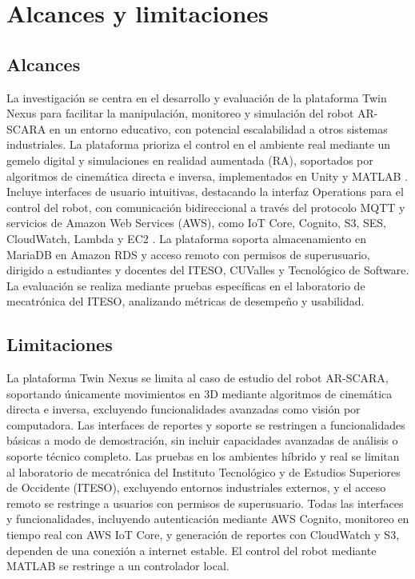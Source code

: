 \documentclass[12pt,letterpaper]{report}
\begin{document}
	\section{Alcances y limitaciones}
	\subsection{Alcances}
	La investigación se centra en el desarrollo y evaluación de la plataforma Twin Nexus para facilitar la manipulación, monitoreo y simulación del robot AR-SCARA en un entorno educativo, con potencial escalabilidad a otros sistemas industriales. La plataforma prioriza el control en el ambiente real mediante un gemelo digital y simulaciones en realidad aumentada (RA), soportados por algoritmos de cinemática directa e inversa, implementados en Unity y MATLAB \cite{mathworks_kinematics_scara_2023}. Incluye interfaces de usuario intuitivas, destacando la interfaz Operations para el control del robot, con comunicación bidireccional a través del protocolo MQTT y servicios de Amazon Web Services (AWS), como IoT Core, Cognito, S3, SES, CloudWatch, Lambda y EC2 \cite{aws_connected_factory_2020}. La plataforma soporta almacenamiento en MariaDB en Amazon RDS y acceso remoto con permisos de superusuario, dirigido a estudiantes y docentes del ITESO, CUValles y Tecnológico de Software. La evaluación se realiza mediante pruebas específicas en el laboratorio de mecatrónica del ITESO, analizando métricas de desempeño y usabilidad.
	\subsection{Limitaciones}
	La plataforma Twin Nexus se limita al caso de estudio del robot AR-SCARA, soportando únicamente movimientos en 3D mediante algoritmos de cinemática directa e inversa, excluyendo funcionalidades avanzadas como visión por computadora. Las interfaces de reportes y soporte se restringen a funcionalidades básicas a modo de demostración, sin incluir capacidades avanzadas de análisis o soporte técnico completo. Las pruebas en los ambientes híbrido y real se limitan al laboratorio de mecatrónica del Instituto Tecnológico y de Estudios Superiores de Occidente (ITESO), excluyendo entornos industriales externos, y el acceso remoto se restringe a usuarios con permisos de superusuario. Todas las interfaces y funcionalidades, incluyendo autenticación mediante AWS Cognito, monitoreo en tiempo real con AWS IoT Core, y generación de reportes con CloudWatch y S3, dependen de una conexión a internet estable. El control del robot mediante MATLAB se restringe a un controlador local.
	
\end{document}
